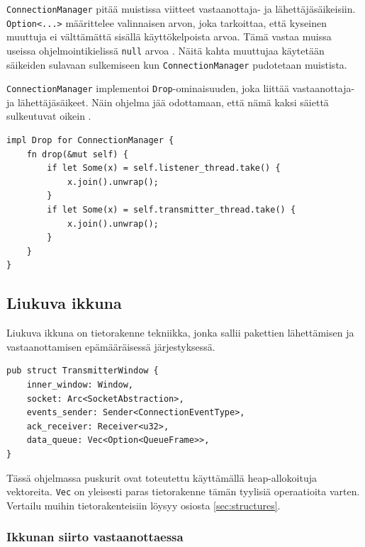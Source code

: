 \documentclass[a4paper,12pt]{article}
\begin{document}
    \lstinline{ConnectionManager} pitää muistissa viitteet vastaanottaja- ja lähettäjäsäikeisiin.
    \lstinline{Option<...>} määrittelee valinnaisen arvon, joka tarkoittaa, että kyseinen muuttuja ei
    välttämättä sisällä käyttökelpoista arvoa. Tämä vastaa muissa useissa ohjelmointikielissä \lstinline{null} arvoa \cite[luku 6.1]{rust-book}. Näitä kahta muuttujaa käytetään säikeiden sulavaan sulkemiseen kun \lstinline{ConnectionManager} pudotetaan muistista.

    \lstinline{ConnectionManager} implementoi \lstinline{Drop}-ominaisuuden, joka liittää vastaanottaja-
    ja lähettäjäsäikeet. Näin ohjelma jää odottamaan, että nämä kaksi säiettä sulkeutuvat oikein \cite{rust_doc_joinhandle}.

    \begin{lstlisting}[caption={Drop-ominaisuuden toteutus ConnectionManager:ille}, label={lst:connectionmanager_drop}]
impl Drop for ConnectionManager {
    fn drop(&mut self) {
        if let Some(x) = self.listener_thread.take() {
            x.join().unwrap();
        }
        if let Some(x) = self.transmitter_thread.take() {
            x.join().unwrap();
        }
    }
}\end{lstlisting}


    \subsection{Liukuva ikkuna}\label{sec:liukuva_ikkuna}
    \slidingWindow
    Liukuva ikkuna on tietorakenne tekniikka, jonka sallii pakettien lähettämisen ja vastaanottamisen epämääräisessä järjestyksessä. 
    



    \begin{lstlisting}[caption={Lähettävän ikkunan rakenne}, label={lst:twindow}]
pub struct TransmitterWindow {
    inner_window: Window,
    socket: Arc<SocketAbstraction>,
    events_sender: Sender<ConnectionEventType>,
    ack_receiver: Receiver<u32>,
    data_queue: Vec<Option<QueueFrame>>,
}\end{lstlisting}

    Tässä ohjelmassa puskurit ovat toteutettu käyttämällä heap-allokoituja vektoreita. \lstinline{Vec} on yleisesti paras tietorakenne tämän tyylisiä operaatioita varten. Vertailu muihin tietorakenteisiin löysyy osiosta \ref{sec:structures}.

    \subsubsection{Ikkunan siirto vastaanottaessa}
\end{document}

